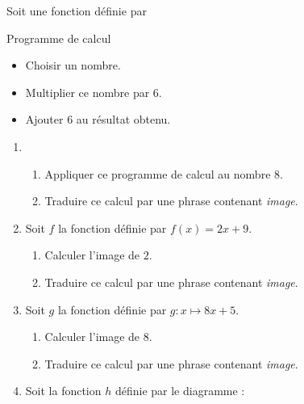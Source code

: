 \begin{exercice}
    Soit une fonction définie par 
    \begin{myBox}{Programme de calcul}
        \begin{itemize}
            \item Choisir un nombre.
            \item Multiplier ce nombre par $6$.
            \item Ajouter $6$ au résultat obtenu.
        \end{itemize}
    \end{myBox}
    \begin{enumerate}
        \item 
        \begin{enumerate}
            \item Appliquer ce programme de calcul au nombre $8$.
            \item Traduire ce calcul par une phrase contenant \textit{image}.
        \end{enumerate}        
        \item Soit $f$ la fonction définie par $f(x)= 2x+9$.
        \begin{enumerate}
            \item Calculer l'image de $2$.
            \item Traduire ce calcul par une phrase contenant \textit{image}.
        \end{enumerate}
        \item Soit $g$ la fonction définie par $g:x\longmapsto 8x+5$.
        \begin{enumerate}
        \item Calculer l'image de $8$.
        \item Traduire ce calcul par une phrase contenant \textit{image}.
    \end{enumerate}
    
        \item Soit la fonction $h$ définie par le diagramme :
        

\end{enumerate}
\end{exercice}
